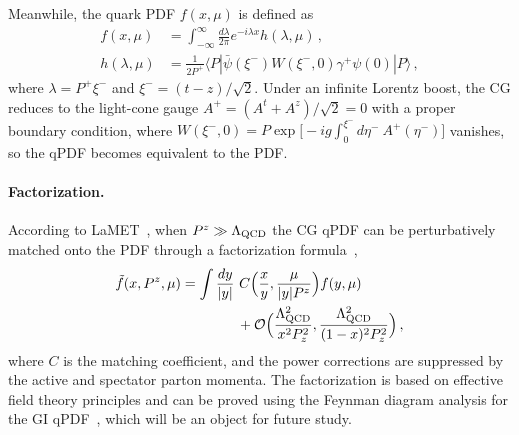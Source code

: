 \documentclass[prd,twocolumn,preprintnumbers,showpacs,nofootinbib,superscriptaddress,notitlepage,floatfix]{revtex4-1}
\newcommand{\nn}{\nonumber}
\begin{document}
Meanwhile, the quark PDF $f(x,\mu)$ is defined as
\begin{align}
    f(x,\mu) &= \int_{-\infty}^\infty \frac{d\lambda}{2\pi} e^{-i\lambda x} h(\lambda,\mu)\,,\\
    h(\lambda,\mu) &= \frac{1}{2P^+} \langle P| \bar{\psi}(\xi^-)W(\xi^-,0) \gamma^+ \psi(0)|P\rangle\,,
\end{align}
where $\lambda=P^+\xi^-$ and $\xi^- = (t- z)/\sqrt{2}$.  Under an infinite Lorentz boost, the CG reduces to the light-cone gauge $A^+=(A^t+A^z)/\sqrt{2}=0$ with a proper boundary condition, where $W(\xi^-,0)=P\exp\big[-ig\int_0^{\xi^-}d\eta^-\ A^+(\eta^-)\big]$ vanishes, so the qPDF becomes equivalent to the PDF.

\paragraph*{Factorization.} According to LaMET~\cite{Ji:2020ect}, when $P^z\gg \Lambda_{\rm QCD}$ the CG qPDF can be perturbatively matched onto the PDF through a factorization formula~\cite{Izubuchi:2018srq},
\begin{align}\label{eq:fact}
	\tilde f(x,P^z,\mu) &= \int {dy\over |y|}\ C\Big({x\over y}, {\mu\over |y|P^z}\Big) f(y,\mu) \nn\\
	&\qquad\qquad + {\cal O}\Big({\Lambda_{\rm QCD}^2\over x^2P_z^2},{\Lambda_{\rm QCD}^2\over(1-x)^2P_z^2}\Big)\,,
\end{align}
where $C$ is the matching coefficient, and the power corrections are suppressed by the active and spectator parton momenta.
The factorization is based on effective field theory principles and can be proved using the Feynman diagram analysis for the GI qPDF~\cite{Ma:2014jla,Ji:2020ect}, which will be an object for future study.
\end{document}

